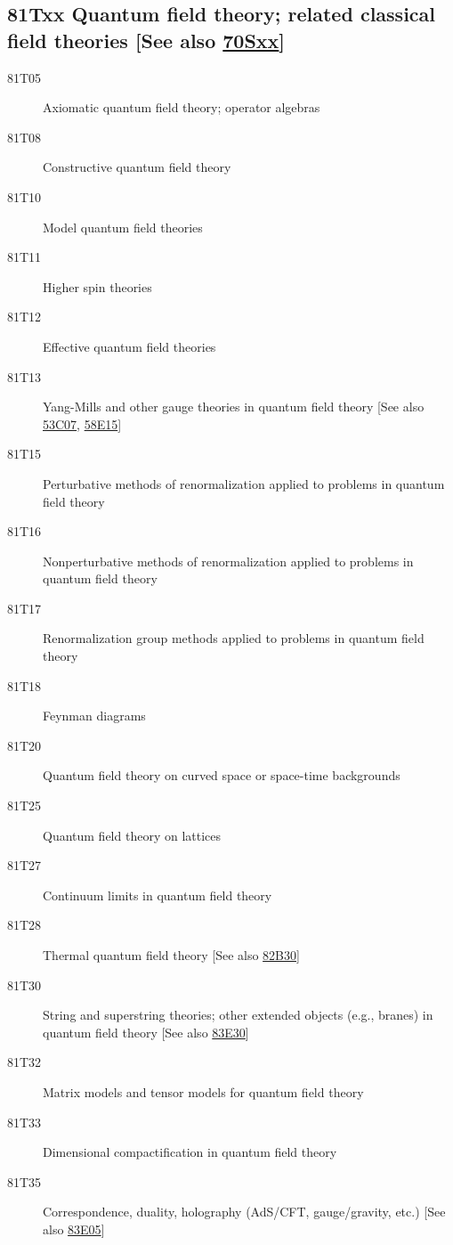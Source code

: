 \subsection*{81Txx  Quantum field theory; related classical field theories [See also \hyperref[70Sxx]{70Sxx}] }\label{81Txx}
\begin{description}  
\item [81T05]\label{81T05} Axiomatic quantum field theory; operator algebras
\item [81T08]\label{81T08} Constructive quantum field theory
\item [81T10]\label{81T10} Model quantum field theories
\item [81T11]\label{81T11} Higher spin theories
\item [81T12]\label{81T12} Effective quantum field theories
\item [81T13]\label{81T13} Yang-Mills and other gauge theories in quantum field theory [See also \hyperref[53C07]{53C07}, \hyperref[58E15]{58E15}]
\item [81T15]\label{81T15} Perturbative methods of renormalization applied to problems in quantum field theory 
\item [81T16]\label{81T16} Nonperturbative methods of renormalization applied to problems in quantum field theory
\item [81T17]\label{81T17} Renormalization group methods applied to problems in quantum field theory
\item [81T18]\label{81T18} Feynman diagrams
\item [81T20]\label{81T20} Quantum field theory on curved space or space-time backgrounds
\item [81T25]\label{81T25} Quantum field theory on lattices
\item [81T27]\label{81T27} Continuum limits in quantum field theory
\item [81T28]\label{81T28} Thermal quantum field theory [See also \hyperref[82B30]{82B30}]
\item [81T30]\label{81T30} String and superstring theories; other extended objects (e.g., branes) in quantum field theory [See also \hyperref[83E30]{83E30}]
\item [81T32]\label{81T32} Matrix models and tensor models for quantum field theory
\item [81T33]\label{81T33} Dimensional compactification in quantum field theory
\item [81T35]\label{81T35} Correspondence, duality, holography (AdS/CFT, gauge/gravity, etc.) [See also \hyperref[83E05]{83E05}]

\end{description}
